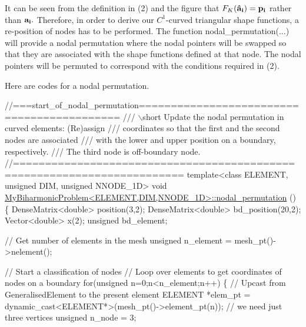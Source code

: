 It can be seen from the definition in (2) and the figure that $ F_{K}(\bf{\hat{a}}_{i}) = \bf{p}_{i}$ rather than $ \bf{a}_i. $ Therefore, in order to derive our $ C^1$-\/curved triangular shape functions, a re-\/position of nodes has to be performed. The function {\ttfamily nodal\+\_\+permutation}(...) will provide a nodal permutation where the nodal pointers will be swapped so that they are associated with the shape functions defined at that node. The nodal pointers will be permuted to correspond with the conditions required in (2).

Here are codes for a nodal permutation.

 
\begin{DoxyCodeInclude}
\textcolor{comment}{//===start\_of\_nodal\_permutation===========================================}
\textcolor{comment}{/// \(\backslash\)short Update the nodal permutation in curved elements: (Re)assign }
\textcolor{comment}{}\textcolor{comment}{/// coordinates so that the first and the second nodes are associated}
\textcolor{comment}{}\textcolor{comment}{/// with the lower and upper position on a boundary, respectively. }
\textcolor{comment}{}\textcolor{comment}{/// The third node is off-boundary node.}
\textcolor{comment}{}\textcolor{comment}{//========================================================================}
\textcolor{keyword}{template}<\textcolor{keyword}{class} ELEMENT, \textcolor{keywordtype}{unsigned} DIM, \textcolor{keywordtype}{unsigned} NNODE\_1D>
 \textcolor{keywordtype}{void} \hyperlink{classMyBiharmonicProblem_a40167119fb35b4926185b7adc23a6358}{MyBiharmonicProblem<ELEMENT,DIM,NNODE\_1D>::nodal\_permutation}
      ()
  \{
   DenseMatrix<double> position(3,2);
   DenseMatrix<double> bd\_position(20,2);
   Vector<double> x(2);
   \textcolor{keywordtype}{unsigned} bd\_element;
  
   \textcolor{comment}{// Get number of elements in the mesh}
   \textcolor{keywordtype}{unsigned} n\_element = mesh\_pt()->nelement();

   \textcolor{comment}{// Start a classification of nodes}
   \textcolor{comment}{// Loop over elements to get coordinates of nodes on a boundary}
   \textcolor{keywordflow}{for}(\textcolor{keywordtype}{unsigned} n=0;n<n\_element;n++)
    \{
     \textcolor{comment}{// Upcast from GeneralisedElement to the present element}
     ELEMENT *elem\_pt = \textcolor{keyword}{dynamic\_cast<}ELEMENT*\textcolor{keyword}{>}(mesh\_pt()->element\_pt(n));
     \textcolor{comment}{// we need just three vertices}
     \textcolor{keywordtype}{unsigned} n\_node = 3;
   

\end{DoxyCodeInclude}
